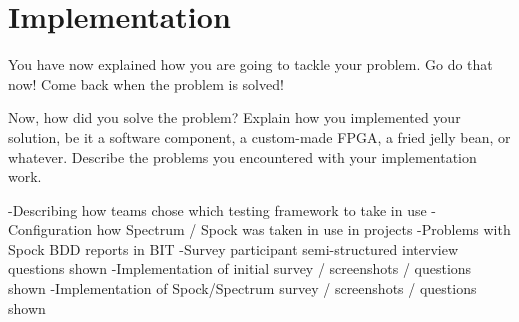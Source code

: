 \chapter{Implementation}
\label{chapter:implementation}

You have now explained how you are going to tackle your problem. 
Go do that now! Come back when the problem is solved!

Now, how did you solve the problem? 
Explain how you implemented your solution, be it a software component, a
custom-made FPGA, a fried jelly bean, or whatever.
Describe the problems you encountered with your implementation work.

-Describing how teams chose which testing framework to take in use
-Configuration how Spectrum / Spock was taken in use in projects
    -Problems with Spock BDD reports in BIT
-Survey participant semi-structured interview questions shown
-Implementation of initial survey / screenshots / questions shown
-Implementation of Spock/Spectrum survey / screenshots / questions shown
